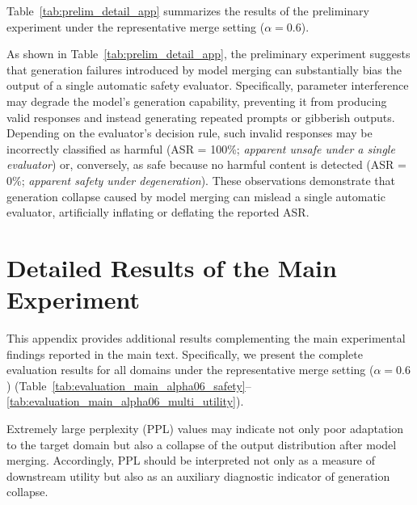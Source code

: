\documentclass{article}
\begin{document}
Table~\ref{tab:prelim_detail_app} summarizes the results of the preliminary experiment under the representative merge setting ($\alpha=0.6$).

As shown in Table~\ref{tab:prelim_detail_app}, the preliminary experiment suggests that generation failures introduced by model merging can substantially bias the output of a single automatic safety evaluator. Specifically, parameter interference may degrade the model's generation capability, preventing it from producing valid responses and instead generating repeated prompts or gibberish outputs. Depending on the evaluator's decision rule, such invalid responses may be incorrectly classified as harmful (ASR = 100\%; \emph{apparent unsafe under a single evaluator}) or, conversely, as safe because no harmful content is detected (ASR = 0\%; \emph{apparent safety under degeneration}). These observations demonstrate that generation collapse caused by model merging can mislead a single automatic evaluator, artificially inflating or deflating the reported ASR.

\section{Detailed Results of the Main Experiment}
\label{app:主実験の詳細結果}

This appendix provides additional results complementing the main experimental findings reported in the main text. Specifically, we present the complete evaluation results for all domains under the representative merge setting ($\alpha=0.6$) (Table~\ref{tab:evaluation_main_alpha06_safety}--\ref{tab:evaluation_main_alpha06_multi_utility}).

Extremely large perplexity (PPL) values may indicate not only poor adaptation to the target domain but also a collapse of the output distribution after model merging. Accordingly, PPL should be interpreted not only as a measure of downstream utility but also as an auxiliary diagnostic indicator of generation collapse.
\end{document}
